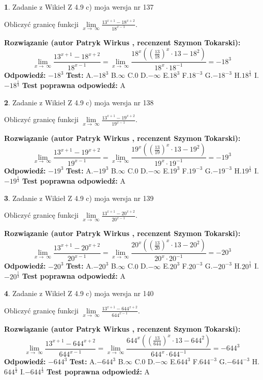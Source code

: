 \documentclass[12pt, a4paper]{article}
\theoremstyle{definition} %
\newtheorem{zad}{}
\newcommand{\zadStart}[1]{\begin{zad}#1\newline}
\newcommand{\zadStop}{\end{zad}}
\newcommand{\rozwStart}[2]{\noindent \textbf{Rozwiązanie (autor #1 , recenzent #2): }\newline}
\newcommand{\rozwStop}{\newline}
\newcommand{\odpStart}{\noindent \textbf{Odpowiedź:}\newline}
\newcommand{\odpStop}{\newline}
\newcommand{\testStart}{\noindent \textbf{Test:}\newline}
\newcommand{\testStop}{\newline}
\newcommand{\kluczStart}{\noindent \textbf{Test poprawna odpowiedź:}\newline}
\newcommand{\kluczStop}{\newline}
\begin{document}
\zadStart{Zadanie z Wikieł Z 4.9 c) moja wersja nr 137}


Obliczyć granicę funkcji  $\lim\limits_{x\to\ \infty}\frac{13^{x+1}-18^{x+2}}{18^{x-1}}$.
\zadStop
\rozwStart{Patryk Wirkus}{Szymon Tokarski}
$$\lim\limits_{x\to\ \infty}\frac{13^{x+1}-18^{x+2}}{18^{x-1}}=\lim\limits_{x\to\ \infty}\frac{18^{x}((\frac{13}{18})^{x}\cdot 13 -18^{2})}{18^{x}\cdot 18^{-1}} = -18^{3}$$
\rozwStop
\odpStart
$-18^{3}$
\odpStop
\testStart
A.$-18^{3}$ B.$\infty$ C.$0$ D.$-\infty$ E.$18^{3}$
F.$18^{-3}$ G.$-18^{-3}$
H.$18^{\frac{1}{3}}$
I.$-18^{\frac{1}{3}}$
\testStop
\kluczStart
A
\kluczStop



\zadStart{Zadanie z Wikieł Z 4.9 c) moja wersja nr 138}


Obliczyć granicę funkcji  $\lim\limits_{x\to\ \infty}\frac{13^{x+1}-19^{x+2}}{19^{x-1}}$.
\zadStop
\rozwStart{Patryk Wirkus}{Szymon Tokarski}
$$\lim\limits_{x\to\ \infty}\frac{13^{x+1}-19^{x+2}}{19^{x-1}}=\lim\limits_{x\to\ \infty}\frac{19^{x}((\frac{13}{19})^{x}\cdot 13 -19^{2})}{19^{x}\cdot 19^{-1}} = -19^{3}$$
\rozwStop
\odpStart
$-19^{3}$
\odpStop
\testStart
A.$-19^{3}$ B.$\infty$ C.$0$ D.$-\infty$ E.$19^{3}$
F.$19^{-3}$ G.$-19^{-3}$
H.$19^{\frac{1}{3}}$
I.$-19^{\frac{1}{3}}$
\testStop
\kluczStart
A
\kluczStop



\zadStart{Zadanie z Wikieł Z 4.9 c) moja wersja nr 139}


Obliczyć granicę funkcji  $\lim\limits_{x\to\ \infty}\frac{13^{x+1}-20^{x+2}}{20^{x-1}}$.
\zadStop
\rozwStart{Patryk Wirkus}{Szymon Tokarski}
$$\lim\limits_{x\to\ \infty}\frac{13^{x+1}-20^{x+2}}{20^{x-1}}=\lim\limits_{x\to\ \infty}\frac{20^{x}((\frac{13}{20})^{x}\cdot 13 -20^{2})}{20^{x}\cdot 20^{-1}} = -20^{3}$$
\rozwStop
\odpStart
$-20^{3}$
\odpStop
\testStart
A.$-20^{3}$ B.$\infty$ C.$0$ D.$-\infty$ E.$20^{3}$
F.$20^{-3}$ G.$-20^{-3}$
H.$20^{\frac{1}{3}}$
I.$-20^{\frac{1}{3}}$
\testStop
\kluczStart
A
\kluczStop



\zadStart{Zadanie z Wikieł Z 4.9 c) moja wersja nr 140}


Obliczyć granicę funkcji  $\lim\limits_{x\to\ \infty}\frac{13^{x+1}-644^{x+2}}{644^{x-1}}$.
\zadStop
\rozwStart{Patryk Wirkus}{Szymon Tokarski}
$$\lim\limits_{x\to\ \infty}\frac{13^{x+1}-644^{x+2}}{644^{x-1}}=\lim\limits_{x\to\ \infty}\frac{644^{x}((\frac{13}{644})^{x}\cdot 13 -644^{2})}{644^{x}\cdot 644^{-1}} = -644^{3}$$
\rozwStop
\odpStart
$-644^{3}$
\odpStop
\testStart
A.$-644^{3}$ B.$\infty$ C.$0$ D.$-\infty$ E.$644^{3}$
F.$644^{-3}$ G.$-644^{-3}$
H.$644^{\frac{1}{3}}$
I.$-644^{\frac{1}{3}}$
\testStop
\kluczStart
A
\kluczStop
\end{document}
